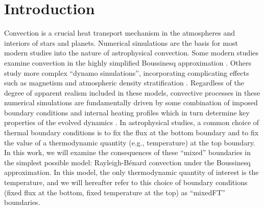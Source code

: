 \documentclass[aps, pre, onecolumn, nofootinbib, notitlepage, groupedaddress, amsfonts, amssymb, amsmath, longbibliography]{revtex4-1}
\newcommand{\RB}{Rayleigh-B\'{e}nard }
\begin{document}

\section{Introduction}
\label{sec:introduction}
Convection is a crucial heat transport mechanism in the atmospheres and interiors of stars and planets.
Numerical simulations are the basis for most modern studies into the nature of astrophysical convection.
Some modern studies examine convection in the highly simplified Boussinesq approximation \cite{spiegel&veronis1960}.
Others study more complex ``dynamo simulations'', incorporating complicating effects such as magnetism and atmospheric density stratification \cite{charbonneau2014, toomre2019}.
Regardless of the degree of apparent realism included in these models, convective processes in these numerical simulations are fundamentally driven by some combination of imposed boundary conditions and internal heating profiles which in turn determine key properties of the evolved dynamics \cite{goluskin2015}.
In astrophysical studies, a common choice of thermal boundary conditions \cite{glatzmaier&gilman1982, hurlburt&all1986, cattaneo&all1990, featherstone&hindman2016a, korre&all2019, wood&brummell2018, kapyla&all2019} is to fix the flux at the bottom boundary and to fix the value of a thermodynamic quantity (e.g., temperature) at the top boundary.
In this work, we will examine the consequences of these ``mixed'' boundaries in the simplest possible model: \RB convection under the Boussinesq approximation.
In this model, the only thermodynamic quantity of interest is the temperature, and we will hereafter refer to this choice of boundary conditions (fixed flux at the bottom, fixed temperature at the top) as ``mixedFT'' boundaries.
\end{document}
